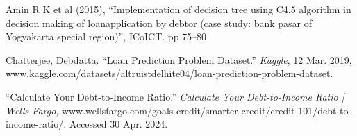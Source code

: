 \documentclass[conference]{IEEEtran}
\begin{document}
\begin{thebibliography}{9}
Amin R K et al (2015), “Implementation of decision tree using C4.5 algorithm in decision making of
loanapplication by debtor (case study: bank pasar of Yogyakarta special region)”, ICoICT. pp 75–80

Chatterjee, Debdatta. “Loan Prediction Problem Dataset.” \textit{Kaggle}, 12 Mar. 2019, www.kaggle.com/datasets/altruistdelhite04/loan-prediction-problem-dataset. 

“Calculate Your Debt-to-Income Ratio.” \textit{Calculate Your Debt-to-Income Ratio | Wells Fargo}, www.wellsfargo.com/goals-credit/smarter-credit/credit-101/debt-to-income-ratio/. Accessed 30 Apr. 2024. 


\end{thebibliography}
    
\end{document}
